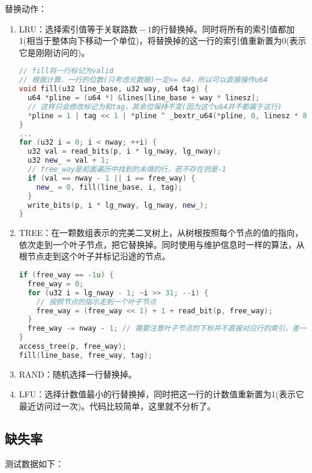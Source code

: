 \documentclass[12pt, UTF8]{article}
\begin{document}
替换动作：

\begin{enumerate}
  \item LRU：选择索引值等于$\text{关联路数} - 1$的行替换掉。同时将所有的索引值都加1(相当于整体向下移动一个单位)，将替换掉的这一行的索引值重新置为0(表示它是刚刚访问的)。

\begin{lstlisting}[language = C++, morekeywords = { u32 }, ndkeywords = { read_bits, write_bits }]
// fill将一行标记为valid
// 根据计算，一行的位数(只考虑元数据)一定<= 64，所以可以直接操作u64
void fill(u32 line_base, u32 way, u64 tag) {
  u64 *pline = (u64 *) &lines[line_base + way * linesz];
  // 这样只会修改标记为和tag，其余位保持不变(因为这个u64并不都属于这行)
  *pline = 1 | tag << 1 | *pline ^ _bextr_u64(*pline, 0, linesz * 8);
}
...
for (u32 i = 0; i < nway; ++i) {
  u32 val = read_bits(p, i * lg_nway, lg_nway);
  u32 new_ = val + 1;
  // free_way是前面遍历中找到的未填的行，若不存在则是-1
  if (val == nway - 1 || i == free_way) {
    new_ = 0, fill(line_base, i, tag);
  }
  write_bits(p, i * lg_nway, lg_nway, new_);
}
\end{lstlisting}
  \item TREE：在一颗数组表示的完美二叉树上，从树根按照每个节点的值的指向，依次走到一个叶子节点，把它替换掉。同时使用与维护信息时一样的算法，从根节点走到这个叶子并标记沿途的节点。

\begin{lstlisting}[language = C++, morekeywords = { u32 }, ndkeywords = { access_tree, read_bit, write_bit }]
if (free_way == -1u) {
  free_way = 0;
  for (u32 i = lg_nway - 1; ~i >> 31; --i) {
    // 按照节点的指示走到一个叶子节点
    free_way = (free_way << 1) + 1 + read_bit(p, free_way);
  }
  free_way -= nway - 1; // 需要注意叶子节点的下标并不直接对应行的索引，差一个偏移量
}
access_tree(p, free_way);
fill(line_base, free_way, tag);
\end{lstlisting}
  \item RAND：随机选择一行替换掉。
  \item LFU：选择计数值最小的行替换掉，同时把这一行的计数值重新置为1(表示它最近访问过一次)。代码比较简单，这里就不分析了。
\end{enumerate}

\subsection{缺失率}

测试数据如下：
\end{document}
